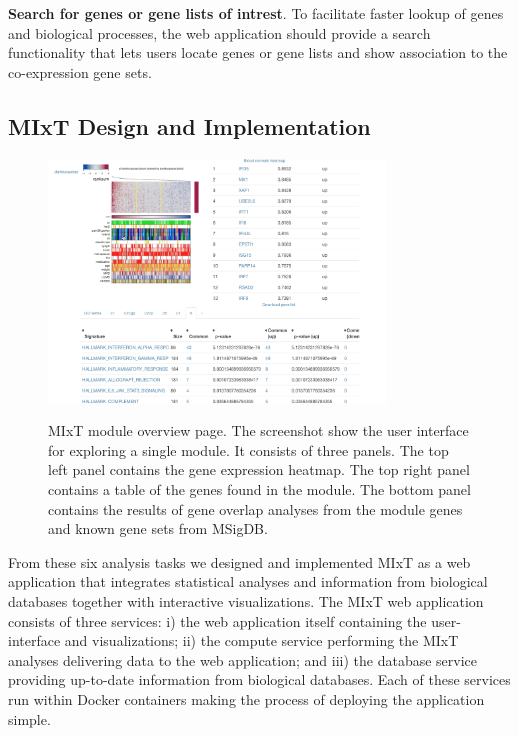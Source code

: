 \textbf{Search for genes or gene lists of intrest}. To facilitate faster lookup
of genes and biological processes, the web application should provide a search
functionality that lets users locate genes or gene lists and show association to
the co-expression gene sets. 


\subsection*{MIxT Design and Implementation} 

\begin{figure}[h!]
\centering
\caption{MIxT module overview page. The screenshot show the user interface for
exploring a single module. It consists of three panels. The top left panel
contains the gene expression heatmap. The top right panel contains a table of
the genes found in the module. The bottom panel contains the results of gene
overlap analyses from the module genes and known gene sets from MSigDB.}
\includegraphics[width=0.8\textwidth]{figures/module.png}
\label{fig_first_case}
\end{figure} 

From these six analysis tasks we designed and implemented MIxT as a web
application that integrates statistical analyses and information from biological
databases together with interactive visualizations.
The MIxT web application
consists of three services: i) the web application itself containing the
user-interface and visualizations; ii) the compute service performing the MIxT
analyses delivering data to the web application; and iii) the database service
providing up-to-date information from biological databases. Each of these
services run within Docker containers making the process of deploying the
application simple. 


